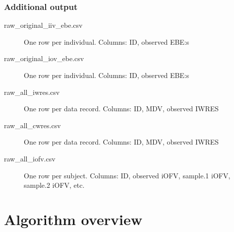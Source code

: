 \subsubsection*{Additional output}
\begin{description}
\item[raw\_original\_iiv\_ebe.csv]  One row per individual. Columns: ID, observed EBE:s
\item[raw\_original\_iov\_ebe.csv]  One row per individual. Columns: ID, observed EBE:s
\item[raw\_all\_iwres.csv] One row per data record. Columns: ID, MDV, observed IWRES %
\item[raw\_all\_cwres.csv] One row per data record. Columns: ID, MDV, observed IWRES %
\item[raw\_all\_iofv.csv] One row per subject. Columns: ID, observed iOFV, sample.1 iOFV, sample.2 iOFV, etc. 
\end{description}


\section{Algorithm overview}

